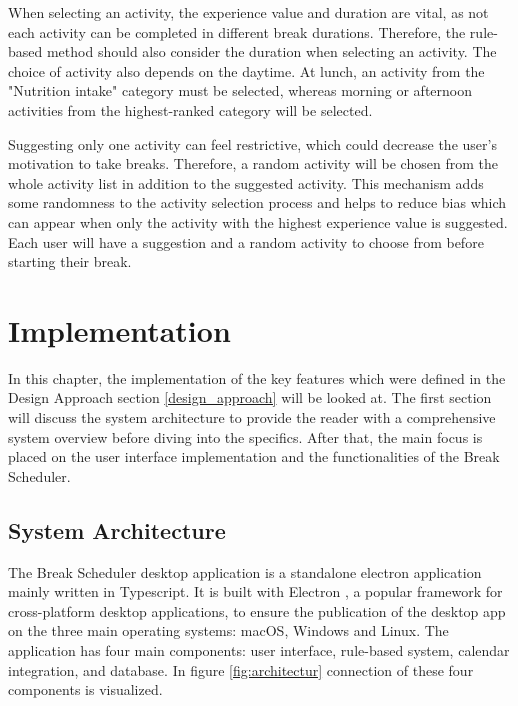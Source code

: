 \documentclass{hasel_thesis}
\begin{document}
When selecting an activity, the experience value and duration are vital, as not each activity can be completed in different break durations. Therefore, the rule-based method should also consider the duration when selecting an activity. The choice of activity also depends on the daytime. At lunch, an activity from the "Nutrition intake" category must be selected, whereas morning or afternoon activities from the highest-ranked category will be selected. 

Suggesting only one activity can feel restrictive, which could decrease the user's motivation to take breaks. Therefore, a random activity will be chosen from the whole activity list in addition to the suggested activity. This mechanism adds some randomness to the activity selection process and helps to reduce bias which can appear when only the activity with the highest experience value is suggested. Each user will have a suggestion and a random activity to choose from before starting their break. 




\chapter{Implementation}

In this chapter, the implementation of the key features which were defined in the Design Approach section \ref{design_approach} will be looked at. The first section will discuss the system architecture to provide the reader with a comprehensive system overview before diving into the specifics. After that, the main focus is placed on the user interface implementation and the functionalities of the Break Scheduler.

\section{System Architecture}

The Break Scheduler desktop application is a standalone electron application mainly written in Typescript. It is built with Electron \cite{electron}, a popular framework for cross-platform desktop applications, to ensure the publication of the desktop app on the three main operating systems: macOS, Windows and Linux. The application has four main components: user interface, rule-based system, calendar integration, and database. In figure \ref{fig:architectur} connection of these four components is visualized.
\end{document}
